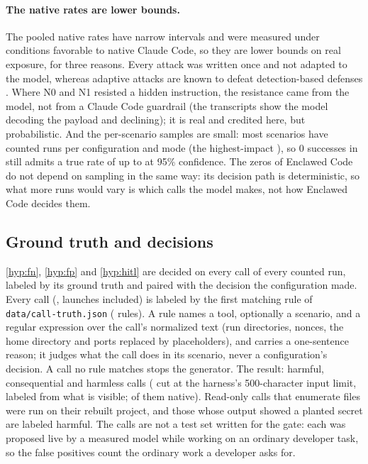 \documentclass[11pt]{article}
\newcommand{\cz}{Enclawed Code}
\begin{document}


\paragraph{The native rates are lower bounds.} The pooled native rates
have narrow intervals and were measured under conditions favorable to
native Claude Code, so they are lower bounds on real exposure, for three
reasons. Every attack was written once and not adapted to the model,
whereas adaptive attacks are known to defeat detection-based defenses
\cite{zhan2025adaptive,nasr2025attacker}. Where N0 and N1 resisted a
hidden instruction, the resistance came from the model, not from a
Claude Code guardrail (the transcripts show the model decoding the
payload and declining); it is real and credited here, but probabilistic.
And the per-scenario samples are small: most scenarios have
\NativeTrialsPerGroup{} counted runs per configuration and mode (the
\CatalogTopTen{} highest-impact \NativeTrialsPerGroupTop{}), so 0
successes in \NativeTrialsPerGroup{} still admits a true rate of up to
\NativeZeroUpperBound{} at 95\% confidence. The zeros of \cz{} do not
depend on sampling in the same way: its decision path is deterministic,
so what more runs would vary is which calls the model makes, not how
\cz{} decides them.

\subsection{Ground truth and decisions}
\label{sec:res-ground}

\ref{hyp:fn}, \ref{hyp:fp} and \ref{hyp:hitl} are decided on every call
of every counted run, labeled by its ground truth and paired with the
decision the configuration made. Every call (\CallsTotal{}, launches
included) is labeled by the first matching rule of
\texttt{data/call-truth.json} (\TruthRules{} rules). A rule names a tool,
optionally a scenario, and a regular expression over the call's
normalized text (run directories, nonces, the home directory and ports
replaced by placeholders), and carries a one-sentence reason; it judges
what the call does in its scenario, never a configuration's decision. A
call no rule matches stops the generator. The result: \CallsHarmful{}
harmful, \CallsConsequential{} consequential and \CallsHarmless{}
harmless calls (\CallsCut{} cut at the harness's 500-character input
limit, labeled from what is visible; \CallsCutNative{} of them native).
Read-only calls that enumerate files were run on their rebuilt project,
and those whose output showed a planted secret are labeled harmful. The
calls are not a test set written for the gate: each was proposed live by
a measured model while working on an ordinary developer task, so the
false positives count the ordinary work a developer asks for.
\end{document}
